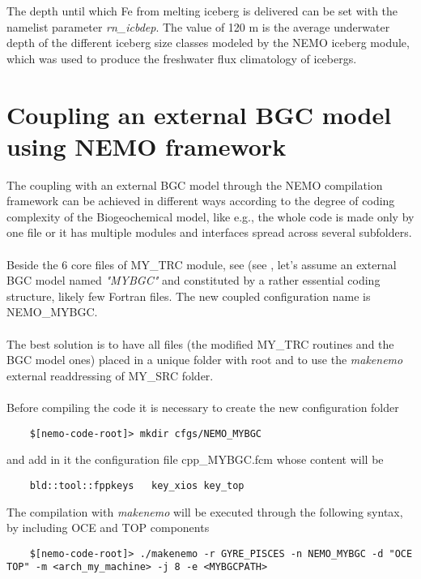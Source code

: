 \documentclass[../main/TOP_manual]{subfiles}
\begin{document}
The depth until which Fe from melting iceberg is delivered can be set with the namelist parameter \textit{rn\_icbdep}. The value of 120 m is the average underwater depth of the different iceberg size classes modeled by the NEMO iceberg module, which was used to produce the freshwater flux climatology of icebergs.

\section{Coupling an external BGC model using NEMO framework}

The coupling with an external BGC model through the NEMO compilation framework can be achieved in different ways according to the degree of coding complexity of the Biogeochemical model, like e.g., the whole code is made only by one file or it has multiple modules and interfaces spread across several subfolders.\\ \\
Beside the 6 core files of MY\_TRC module, see (see \label{Mytrc}, let's assume an external BGC model named \textit{"MYBGC"} and constituted by a rather essential coding structure, likely few Fortran files. The new coupled configuration name is NEMO\_MYBGC. \\ \\
The best solution is to have all files (the modified MY\_TRC routines and the BGC model ones) placed in a unique folder with root  and to use the \textit{makenemo} external readdressing of MY\_SRC folder. \\ \\
Before compiling the code it is necessary to create the new configuration folder

\begin{verbatim}
    $[nemo-code-root]> mkdir cfgs/NEMO_MYBGC
\end{verbatim}

and add in it the configuration file cpp\_MYBGC.fcm whose content will be

\begin{verbatim}
    bld::tool::fppkeys   key_xios key_top
\end{verbatim}

The compilation with \textit{makenemo} will be executed through the following syntax, by including OCE and TOP components

\begin{verbatim}
    $[nemo-code-root]> ./makenemo -r GYRE_PISCES -n NEMO_MYBGC -d "OCE TOP" -m <arch_my_machine> -j 8 -e <MYBGCPATH>
\end{verbatim}
\end{document}
